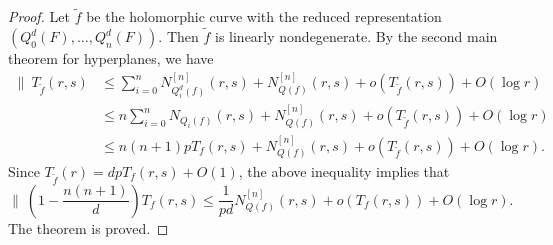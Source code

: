 \documentclass[10pt,a4paper]{amsart}
\begin{document}
\begin{proof}
Let $\tilde f$ be the holomorphic curve with the reduced representation $(Q_0^d(F),\ldots,Q_n^d(F))$. Then $\tilde f$ is linearly nondegenerate. By the second main theorem for hyperplanes, we have
\begin{align*}
\bigl\|\ T_{\tilde f}(r,s)&\le\sum_{i=0}^nN^{[n]}_{Q_i^d(f)}(r,s)+N^{[n]}_{Q(f)}(r,s)+o(T_{\tilde f}(r,s))+O(\log r)\\
&\le n\sum_{i=0}^nN_{Q_i(f)}(r,s)+N^{[n]}_{Q(f)}(r,s)+o(T_{\tilde f}(r,s))+O(\log r)\\
&\le n(n+1)pT_f(r,s)+N^{[n]}_{Q(f)}(r,s)+o(T_{\tilde f}(r,s))+O(\log r).
\end{align*}
Since $T_{\tilde f}(r)=dpT_f(r,s)+O(1)$, the above inequality implies that
$$ \biggl \|\ \left(1-\frac{n(n+1)}{d}\right)T_f(r,s)\le \frac{1}{pd}N^{[n]}_{Q(f)}(r,s)+o(T_f(r,s))+O(\log r).$$
The theorem is proved.
\end{proof}
\end{document}
